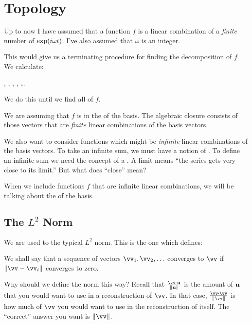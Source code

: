 \section{Topology}

Up to now I have assumed that a function $f$ is a linear combination of
a \emph{finite} number of $\exp\mathopen{}\left( {i\omega t} \right)\mathclose{}$. I've also assumed that
$\omega$ is an integer.

This would give us a terminating procedure for finding the decomposition
of $f$. We calculate:

\begin{nedqn}
  ,
  ,
  ,
  ,
  \ldots
\end{nedqn}

We do this until we find all of $f$.

We are assuming that $f$ is in the  of the
basis. The algebraic closure consists of those vectors that are
\emph{finite} linear combinations of the basis vectors.

We also want to consider functions which might be \emph{infinite} linear
combinations of the basis vectors. To take an infinite sum, we must have
a notion of . To define an infinite sum we need the
concept of a . A limit means ``the series gets very close
to its limit.'' But what does ``close'' mean?

When we include functions $f$ that are infinite linear combinations, we
will be talking about the  of the basis.

\subsection{The $L^2$ Norm}

We are used to the typical $L^2$ norm. This is the one which defines:

\begin{nedqn}
  \norm{\vv}
\eqcol
  \sqrt{\vv \cdot \vv}
\end{nedqn}

We shall say that a sequence of vectors $\vv_1, \vv_2, \ldots$ converges
to $\vv$ if $\norm{\vv - \vv_i}$ converges to zero.

Why should we define the norm this way? Recall that $\frac{\vv \cdot
\vu}{\norm{\vu}}$ is the amount of $\bm{\mathrm{u}}$ that you would want to use in a
reconstruction of $\vv$. In that case, $\frac{\vv \cdot
\vv}{\norm{\vv}}$ is how much of $\vv$ you would want to use in the
reconstruction of itself. The ``correct'' answer you want is
$\norm{\vv}$.

